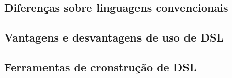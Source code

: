 \subsection{Diferenças sobre linguagens convencionais}
\label{diferencasdsl}


\subsection{Vantagens e desvantagens de uso de DSL}
\label{beneficiosdsl}


\subsection{Ferramentas de cronstrução de DSL}
\label{ferramentasdsl}